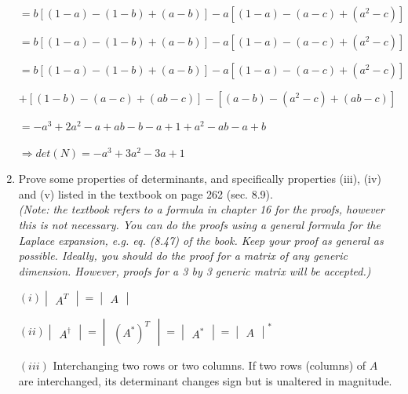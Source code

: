 \documentclass[fleqn]{article}
\begin{document}
\begin{enumerate}
      \bigbreak

      \textcolor{hwColor}{$=b\left[(1-a)-(1-b)+(a-b)\right]-a\left[(1-a)-(a-c)+(a^2-c)\right]$}

      \textcolor{hwColor}{$=b\left[(1-a)-(1-b)+(a-b)\right]-a\left[(1-a)-(a-c)+(a^2-c)\right]$}

      \textcolor{hwColor}{$=b\left[(1-a)-(1-b)+(a-b)\right]-a\left[(1-a)-(a-c)+(a^2-c)\right]$}

      \textcolor{hwColor}{$+\left[(1-b)-(a-c)+(ab-c)\right]-\left[(a-b)-(a^2-c)+(ab-c)\right]$}

      \textcolor{hwColor}{$=-a^3+2a^2-a+ab-b-a+1+a^2-ab-a+b$}
   
      \textcolor{hwColor}{    
        $
        \Longrightarrow
        det(N)=-a^3+3a^2-3a+1
        $
      }


    \item Prove some properties of determinants, and specifically properties (iii), (iv) and (v) listed in the textbook on page 262 (sec. 8.9). \\
    \emph{(Note: the textbook refers to a formula in chapter 16 for the proofs, however this is not necessary. You can do the proofs using a general formula for the Laplace expansion, e.g. eq. (8.47) of the book. Keep your proof as general as possible. Ideally, you should do the proof for a matrix of any generic dimension. However, proofs for a 3 by 3 generic matrix will be accepted.) }

    $(i) \begin{vmatrix}
      A^T
    \end{vmatrix}=
    \begin{vmatrix}
      A
    \end{vmatrix}
    $

    $
    (ii) \begin{vmatrix}
      A^{\dagger}
    \end{vmatrix}=\begin{vmatrix}
      (A^*)^T
    \end{vmatrix}=\begin{vmatrix}
      A^*
    \end{vmatrix}=\begin{vmatrix}
      A
    \end{vmatrix}^*
    $

    $(iii)$ Interchanging two rows or two columns. If two rows (columns) of $A$ are interchanged, its determinant changes sign but is unaltered in magnitude.


\end{enumerate}
\end{document}
